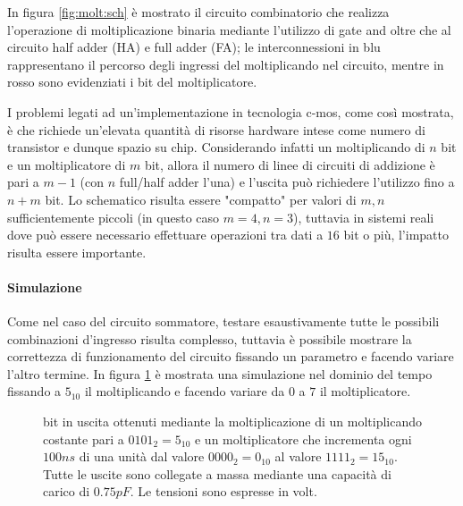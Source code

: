 	In figura \ref{fig:molt:sch} è mostrato il circuito combinatorio che realizza l'operazione di moltiplicazione binaria mediante l'utilizzo di gate and oltre che al circuito half adder (HA) e full adder (FA); le interconnessioni in blu rappresentano il percorso degli ingressi del moltiplicando nel circuito, mentre in rosso sono evidenziati i bit del moltiplicatore.
	
	I problemi legati ad un'implementazione in tecnologia c-mos, come così mostrata, è che richiede un'elevata quantità di risorse hardware intese come numero di transistor e dunque spazio su chip. Considerando infatti un moltiplicando di $n$ bit e un moltiplicatore di $m$ bit, allora il numero di linee di circuiti di addizione è pari a $m-1$ (con $n$ full/half adder l'una) e l'uscita può richiedere l'utilizzo fino a $n+m$ bit. Lo schematico risulta essere "compatto" per valori di $m,n$ sufficientemente piccoli (in questo caso $m=4,n=3$), tuttavia in sistemi reali dove può essere necessario effettuare operazioni tra dati a $16$ bit o più, l'impatto risulta essere importante.
	
	\paragraph{Simulazione} Come nel caso del circuito sommatore, testare esaustivamente tutte le possibili combinazioni d'ingresso risulta complesso, tuttavia è possibile mostrare la correttezza di funzionamento del circuito fissando un parametro e facendo variare l'altro termine. In figura \ref{fig:molt:sim} è mostrata una simulazione nel dominio del tempo fissando a $5_{10}$ il moltiplicando e facendo variare da $0$ a $7$ il moltiplicatore.
	
	\begin{figure}[bht]
		\centering
		
		\caption{bit in uscita ottenuti mediante la moltiplicazione di un moltiplicando costante pari a $0101_2=5_{10}$ e un moltiplicatore che incrementa ogni $100ns$ di una unità dal valore $0000_2=0_{10}$ al valore $1111_2=15_{10}$. Tutte le uscite sono collegate a massa mediante una capacità di carico di $0.75pF$. Le tensioni sono espresse in volt. }
		\label{fig:molt:sim}
	\end{figure}
	
	
	
	
	
